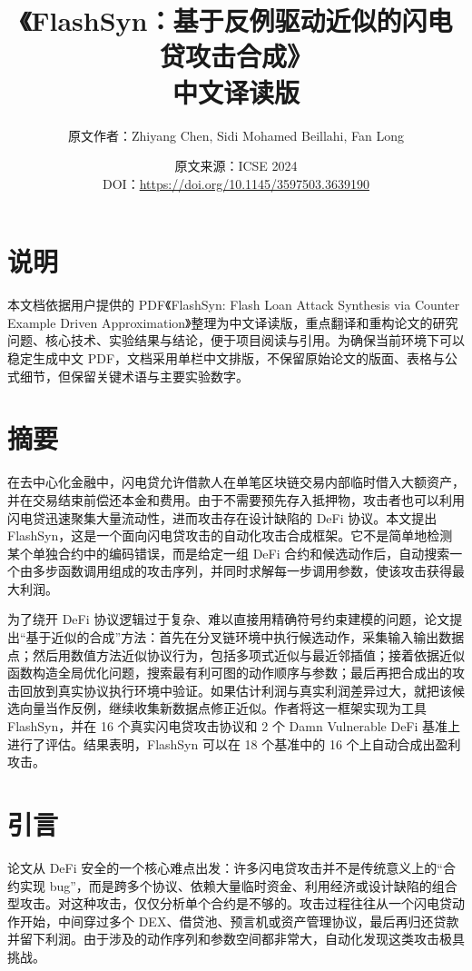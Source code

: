 \documentclass[UTF8,11pt]{ctexart}
\title{《FlashSyn：基于反例驱动近似的闪电贷攻击合成》\\中文译读版}
\author{原文作者：Zhiyang Chen, Sidi Mohamed Beillahi, Fan Long}
\date{原文来源：ICSE 2024\\DOI：\url{https://doi.org/10.1145/3597503.3639190}}
\begin{document}
\maketitle

\section*{说明}
本文档依据用户提供的 PDF《FlashSyn: Flash Loan Attack Synthesis via Counter Example Driven Approximation》整理为中文译读版，重点翻译和重构论文的研究问题、核心技术、实验结果与结论，便于项目阅读与引用。为确保当前环境下可以稳定生成中文 PDF，文档采用单栏中文排版，不保留原始论文的版面、表格与公式细节，但保留关键术语与主要实验数字。

\section*{摘要}
在去中心化金融中，闪电贷允许借款人在单笔区块链交易内部临时借入大额资产，并在交易结束前偿还本金和费用。由于不需要预先存入抵押物，攻击者也可以利用闪电贷迅速聚集大量流动性，进而攻击存在设计缺陷的 DeFi 协议。本文提出 FlashSyn，这是一个面向闪电贷攻击的自动化攻击合成框架。它不是简单地检测某个单独合约中的编码错误，而是给定一组 DeFi 合约和候选动作后，自动搜索一个由多步函数调用组成的攻击序列，并同时求解每一步调用参数，使该攻击获得最大利润。

为了绕开 DeFi 协议逻辑过于复杂、难以直接用精确符号约束建模的问题，论文提出“基于近似的合成”方法：首先在分叉链环境中执行候选动作，采集输入输出数据点；然后用数值方法近似协议行为，包括多项式近似与最近邻插值；接着依据近似函数构造全局优化问题，搜索最有利可图的动作顺序与参数；最后再把合成出的攻击回放到真实协议执行环境中验证。如果估计利润与真实利润差异过大，就把该候选向量当作反例，继续收集新数据点修正近似。作者将这一框架实现为工具 FlashSyn，并在 16 个真实闪电贷攻击协议和 2 个 Damn Vulnerable DeFi 基准上进行了评估。结果表明，FlashSyn 可以在 18 个基准中的 16 个上自动合成出盈利攻击。

\section{引言}
论文从 DeFi 安全的一个核心难点出发：许多闪电贷攻击并不是传统意义上的“合约实现 bug”，而是跨多个协议、依赖大量临时资金、利用经济或设计缺陷的组合型攻击。对这种攻击，仅仅分析单个合约是不够的。攻击过程往往从一个闪电贷动作开始，中间穿过多个 DEX、借贷池、预言机或资产管理协议，最后再归还贷款并留下利润。由于涉及的动作序列和参数空间都非常大，自动化发现这类攻击极具挑战。
\end{document}
